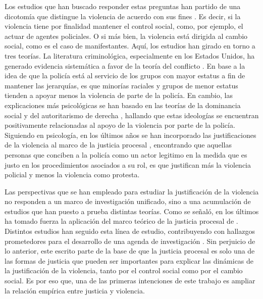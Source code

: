 \documentclass[12pt,twoside]{templates/facsothesis}
\begin{document}
Los estudios que han buscado responder estas preguntas han partido de una dicotomía que distingue la violencia de acuerdo con sus fines \citep{Blumenthal1972}. Es decir, si la violencia tiene por finalidad mantener el control social, como, por ejemplo, el actuar de agentes policiales. O si más bien, la violencia está dirigida al cambio social, como es el caso de manifestantes. Aquí, los estudios han girado en torno a tres teorías. La literatura criminológica, especialmente en los Estados Unidos, ha generado evidencia sistemática a favor de la teoría del conflicto \citep{Thompson2004}. En base a la idea de que la policía está al servicio de los grupos con mayor estatus a fin de mantener las jerarquías, es que minorías raciales y grupos de menor estatus tienden a apoyar menos la violencia de parte de la policía. En cambio, las explicaciones más psicológicas se han basado en las teorías de la dominancia social \citep{Sidanius1999} y del autoritarismo de derecha \citep{Altemeyer1988}, hallando que estas ideologías se encuentran positivamente relacionadas al apoyo de la violencia por parte de la policía. Siguiendo en psicología, en los últimos años se han incorporado las justificaciones de la violencia al marco de la justicia procesal \citep{Tyler2006}, encontrando que aquellas personas que conciben a la policía como un actor legitimo en la medida que es justo en los procedimientos asociados a su rol, es que justifican más la violencia policial y menos la violencia como protesta.

Las perspectivas que se han empleado para estudiar la justificación de la violencia no responden a un marco de investigación unificado, sino a una acumulación de estudios que han puesto a prueba distintas teorías. Como se señaló, en los últimos ha tomado fuerza la aplicación del marco teórico de la justicia procesal de \citet{Tyler2006}. Distintos estudios han seguido esta línea de estudio, contribuyendo con hallazgos prometedores para el desarrollo de una agenda de investigación \citep[e.g.][]{Puga2016, Gerber2016, Gerber2017a, Gerber2017}. Sin perjuicio de lo anterior, este escrito parte de la base de que la justicia procesal es solo una de las formas de justicia que pueden ser importantes para explicar las dinámicas de la justificación de la violencia, tanto por el control social como por el cambio social. Es por eso que, una de las primeras intenciones de este trabajo es ampliar la relación empírica entre justicia y violencia.
\end{document}
